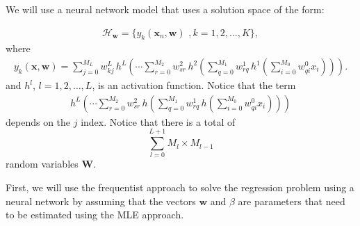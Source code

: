 \documentclass{tufte-handout}
\begin{document}
We will use a neural network model that uses a solution space of the form:

\begin{align*}
\mathcal H_{\mathbf w} = \{ y_k(\mathbf x_n, \mathbf w)\,\,, k=1,2,\dots,K\},
\end{align*}
where
\begin{align*}
y_k(\mathbf x, \mathbf w) =  \sum_{j=0}^{M_L} w_{kj}^{L}\,h^L \left(\cdots \sum_{r=0}^{M_2} w_{sr}^{2}\,  h^2\left(\sum_{q=0}^{M_1} w_{rq}^{1}\, h^1\left(  \sum_{i=0}^{M_0} w_{qi}^{0}x_i \right) \right) \right).
\end{align*}
and $h^l$, $l=1,2,\dots,L$, is an activation function.
Notice that the term
\begin{align*}
h^L\left(\cdots \sum_{r=0}^{M_2} w_{sr}^{2}\,  h\left(\sum_{q=0}^{M_1} w_{rq}^{1}\, h\left(  \sum_{i=0}^{M_0} w_{qi}^{0}x_i \right) \right) \right)
\end{align*}
depends on the $j$ index.
Notice that there is a total  of $$\sum_{l=0}^{L+1} M_l \times M_{l-1}$$
random variables $\mathbf W$. 

First, we will use the frequentist approach to solve the regression problem using a neural network by assuming that the vectors $\mathbf w$  and $\beta$ are parameters that need to be estimated using the MLE approach.

\begin{center}
\end{center}
\end{document}
